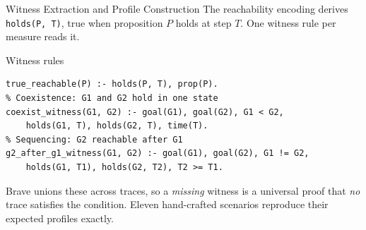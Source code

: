 \begin{frame}[fragile]{Witness Extraction and Profile Construction}
    The reachability encoding derives \texttt{holds(P, T)}, true when proposition $P$ holds at step $T$. One witness rule per measure reads it.

    \begin{block}{Witness rules}
        \begin{lstlisting}[style=asp]
% True reachability: P in some reachable state
true_reachable(P) :- holds(P, T), prop(P).
% Coexistence: G1 and G2 hold in one state
coexist_witness(G1, G2) :- goal(G1), goal(G2), G1 < G2,
    holds(G1, T), holds(G2, T), time(T).
% Sequencing: G2 reachable after G1
g2_after_g1_witness(G1, G2) :- goal(G1), goal(G2), G1 != G2,
    holds(G1, T1), holds(G2, T2), T2 >= T1.
        \end{lstlisting}
    \end{block}

    {\small Brave unions these across traces, so a \emph{missing} witness is a universal proof that \emph{no} trace satisfies the condition. Eleven hand-crafted scenarios reproduce their expected profiles exactly.}

\end{frame}
